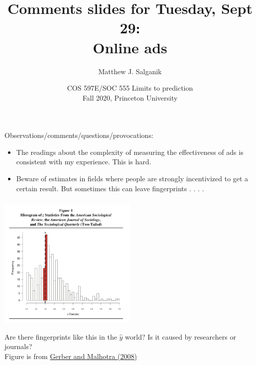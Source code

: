 \documentclass[aspectratio=169]{beamer}
\title[]{Comments slides for Tuesday, Sept 29:\\Online ads}
\author[]{Matthew J. Salganik}
\institute[]{}
\date[]{COS 597E/SOC 555 Limits to prediction\\Fall 2020, Princeton University}
\begin{document}
\frame{\titlepage}
\begin{frame}
\frametitle{}

Observations/comments/questions/provocations:
\begin{itemize}
\item The readings about the complexity of measuring the effectiveness of ads is consistent with my experience.  This is hard.
\pause
\item Beware of estimates in fields where people are strongly incentivized to get a certain result. But sometimes this can leave fingerprints . . . . 
\end{itemize}

\end{frame}
\begin{frame}
\frametitle{}

\begin{center}
\includegraphics[width=0.5\textwidth]{figures/gerber_publication_2008_fig1}
\end{center}

\vfill
Are there fingerprints like this in the $\hat{y}$ world? Is it caused by researchers or journals?\\
Figure is from \href{https://doi.org/10.1177/0049124108318973}{Gerber and Malhotra (2008)}
\end{frame}
\end{document}
